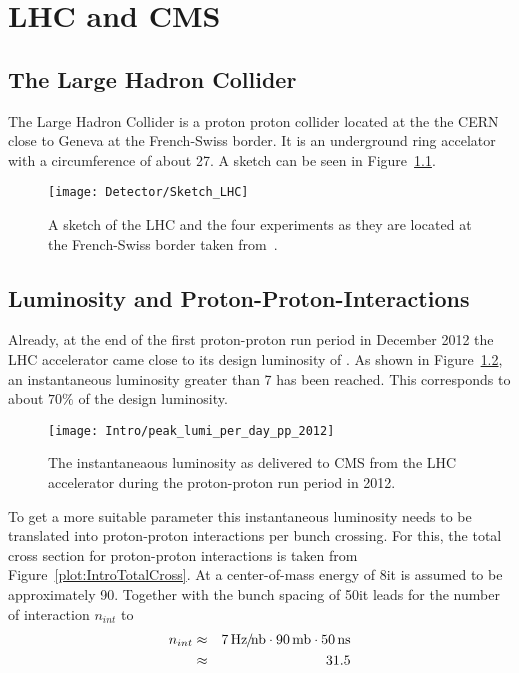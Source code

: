 \chapter{LHC and CMS \label{sec:LHCCMS}}

\section{The Large Hadron Collider \label{LHCCMSLHC}}

The Large Hadron Collider is a proton proton collider located at the the CERN close to Geneva at the French-Swiss border. It is an underground ring accelator with a circumference of about 27\km{}. A sketch can be seen in Figure~\ref{plot:LCSketchLHS}.

\begin{figure}[!ht]
  \centering
  \texttt{[image: Detector/Sketch\_LHC]}
  \caption[Sketch of the LHC]{A sketch of the LHC and the four experiments as they are located at the French-Swiss border taken from~\cite{Team:40525}. \label{plot:LCSketchLHS}}
\end{figure}

\section{Luminosity and Proton-Proton-Interactions \label{sec:IntroLumiPPI}}

Already, at the end of the first proton-proton run period in December 2012 the LHC accelerator came close to its design luminosity of \LHigh{}. As shown in Figure~\ref{plot:IntroInstLumi}, an instantaneous luminosity greater than 7\hertzpernbarn{} has been reached. This corresponds to about $70\%$ of the design luminosity.

\begin{figure}[!Hhtb]
  \centering
  \texttt{[image: Intro/peak\_lumi\_per\_day\_pp\_2012]}
  \caption[Instantaneous luminosity at CMS]{The instantaneaous luminosity as delivered to CMS from the LHC accelerator during the proton-proton run period in 2012. \label{plot:IntroInstLumi}}
\end{figure}

To get  a more suitable parameter this instantaneous luminosity needs to be translated into proton-proton interactions per bunch crossing. For this, the total cross section for proton-proton interactions is taken from Figure~\ref{plot:IntroTotalCross}. At a center-of-mass energy of 8\TeV it is assumed to be approximately 90\mb. Together with the bunch spacing of 50\ns it leads for the number of interaction $n_{int}$ to
\begin{eqnarray}
n_{int} & \approx & 7\, \text{Hz\hspace{-0.08em}/\hspace{-0.16em}}\text{nb} \cdot 90\,\text{mb} \cdot 50\,\text{ns} \nonumber \\
 & \approx & 31.5 \nonumber
\end{eqnarray}

